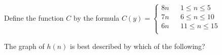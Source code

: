 \documentclass{ximera}
\begin{document}
\begin{definition}
Define the function $C$ by the formula $C(y) =   \left \{ \begin{aligned}     8 n && 1 \leq n \leq 5 \\        7 n && 6 \leq n \leq 10 \\      
6 n && 11 \leq n \leq 15 \\       \end{aligned} \right .$ 
\end{definition}






\begin{exercise}
The graph of $h(n)$ is best described by which of the following?

\begin{multipleChoice}
\end{multipleChoice}

\end{exercise}
\end{document}
